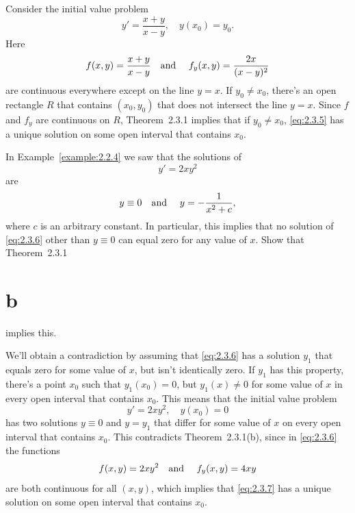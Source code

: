 \setcounter{example}{2}
\setcounter{equation}{4}
\begin{example}
  \label{example:2.3.3} \rm Consider the initial value problem
  \begin{equation}
    \label{eq:2.3.5}y'=\frac{x+y}{x-y},\quad y(x_{0})=y_{0}.
  \end{equation}
  Here
  \[
    f(x,y)=\frac{x+y}{x-y}\mbox{\quad and \quad}f_{y}(x,y)=\frac{2x}{(x-y)^{2}}
  \]
  are continuous everywhere except on the line $y=x$. If $y_{0}\ne x_{0}$, there's an open rectangle
  $R$ that contains $(x_{0},y_{0})$ that does not intersect the line $y=x$. Since $f$ and $f_{y}$
  are continuous on $R$, Theorem~2.3.1 implies that if $y_{0}\ne x_{0}$,
  \eqref{eq:2.3.5} has a unique solution on some open interval that contains $x_{0}$.
\end{example}

\setcounter{example}{3}
\setcounter{equation}{5}
\begin{example}
  \label{example:2.3.4} \rm In Example~\ref{example:2.2.4} we saw that the solutions of
  \begin{equation}
    \label{eq:2.3.6}y'=2xy^{2}
  \end{equation}
  are
  \[
    y\equiv0\mbox{\quad and \quad}y=-\frac{1}{x^{2}+c},
  \]
  where $c$ is an arbitrary constant. In particular, this implies that no solution of
  \eqref{eq:2.3.6} other than $y\equiv0$ can equal zero for any value of $x$. Show that
  Theorem~2.3.1\part{b} implies this.
\end{example}
\setcounter{equation}{6}
\begin{examplesolution}
\solution We'll obtain a contradiction by assuming that \eqref{eq:2.3.6} has a solution $y_{1}$ that
equals zero for some value of $x$, but isn't identically zero. If $y_{1}$ has this property, there's
a point $x_{0}$ such that $y_{1}(x_{0})=0$, but $y_{1}(x)\ne0$ for some value of $x$ in every open
interval that contains $x_{0}$. This means that the initial value problem
\begin{equation}
  \label{eq:2.3.7}y'=2xy^{2},\quad y(x_{0})=0
\end{equation}
has two solutions $y\equiv0$ and $y=y_{1}$ that differ for some value of $x$ on every open interval
that contains $x_{0}$. This contradicts Theorem~2.3.1(b), since in \eqref{eq:2.3.6}
the functions
\[
  f(x,y)=2xy^{2}\mbox{\quad and \quad}f_{y}(x,y)=4xy
\]
are both continuous for all $(x,y)$, which implies that \eqref{eq:2.3.7} has a unique solution on
some open interval that contains $x_{0}$.
\end{examplesolution}

